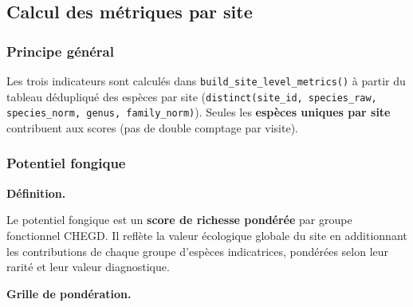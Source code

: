 \documentclass[11pt,a4paper]{article}
\begin{document}
\subsection{Calcul des métriques par site}

\subsubsection{Principe général}

Les trois indicateurs sont calculés dans \texttt{build\_site\_level\_metrics()} à partir du
tableau dédupliqué des espèces par site (\texttt{distinct(site\_id, species\_raw, species\_norm,
genus, family\_norm)}). Seules les \textbf{espèces uniques par site} contribuent aux scores
(pas de double comptage par visite).

\subsubsection{Potentiel fongique}

\medskip
\noindent\textbf{Définition.}\par

Le potentiel fongique est un \textbf{score de richesse pondérée} par groupe fonctionnel CHEGD.
Il reflète la valeur écologique globale du site en additionnant les contributions de chaque
groupe d'espèces indicatrices, pondérées selon leur rarité et leur valeur diagnostique.

\medskip
\noindent\textbf{Grille de pondération.}\par
\end{document}
